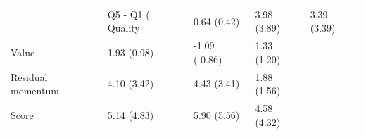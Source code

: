 \begin{tabular}{llll}
\toprule
 & Q5 - Q1 (%
\midrule
Quality & 0.64 (0.42) & 3.98 (3.89) & 3.39 (3.39) \\
Value & 1.93 (0.98) & -1.09 (-0.86) & 1.33 (1.20) \\
Residual momentum & 4.10 (3.42) & 4.43 (3.41) & 1.88 (1.56) \\
Score & 5.14 (4.83) & 5.90 (5.56) & 4.58 (4.32) \\
\bottomrule
\end{tabular}
